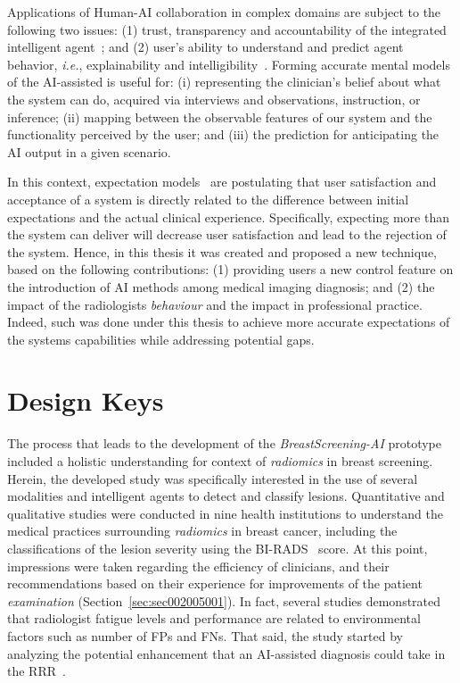 Applications of Human-\ac{AI} collaboration in complex domains are subject to  the following two issues:
(1) trust, transparency and accountability of the integrated intelligent agent~\cite{10.1145/3290605.3300233}; and
(2) user's ability to understand and predict agent behavior, {\it i.e.}, explainability and intelligibility~\cite{Cai:2019:EEE:3301275.3302289, gunning2017explainable, miller2018explanation}.
Forming accurate mental models of the \ac{AI}-assisted is useful for:
(i) representing the clinician's belief about what the system can do, acquired via interviews and observations, instruction, or inference;
(ii) mapping between the observable features of our system and the functionality perceived by the user; and (iii) the prediction for anticipating the AI output in a given scenario.

In this context, expectation models~\cite{Kocielnik:2019:YAI:3290605.3300641, leung2019health} are postulating that user satisfaction and acceptance of a system is directly related to the difference between initial expectations and the actual clinical experience.
Specifically, expecting more than the system can deliver will decrease user satisfaction and lead to the rejection of the system.
Hence, in this thesis it was created and proposed a new technique, based on the following contributions:
(1) providing users a new control feature on the introduction of \ac{AI} methods among medical imaging diagnosis; and
(2) the impact of the radiologists {\it behaviour} and the impact in professional practice.
Indeed, such was done under this thesis to achieve more accurate expectations of the systems capabilities while addressing potential gaps.

\section{Design Keys}
\label{sec:sec005003}

The process that leads to the development of the {\it BreastScreening-AI} prototype~\cite{https://doi.org/10.13140/rg.2.2.29816.70409} included a holistic understanding for context of {\it radiomics} in breast screening.
Herein, the developed study was specifically interested in the use of several modalities and intelligent agents to detect and classify lesions.
Quantitative and qualitative studies were conducted in nine health institutions to understand the medical practices surrounding {\it radiomics} in breast cancer, including the classifications of the lesion severity using the \ac{BI-RADS}~\cite{https://doi.org/10.13140/rg.2.2.36306.86725} score.
At this point, impressions were taken regarding the efficiency of clinicians, and their recommendations based on their experience for improvements of the patient {\it examination} (Section~\ref{sec:sec002005001}).
In fact, several studies demonstrated~\cite{waite2017tired} that radiologist fatigue levels and performance are related to environmental factors such as number of \acp{FP} and \acp{FN}.
That said, the study started by analyzing the potential enhancement that an \ac{AI}-assisted diagnosis could take in the \ac{RRR}~\cite{chatelain2018evaluation, miglioretti2007radiologist}.

